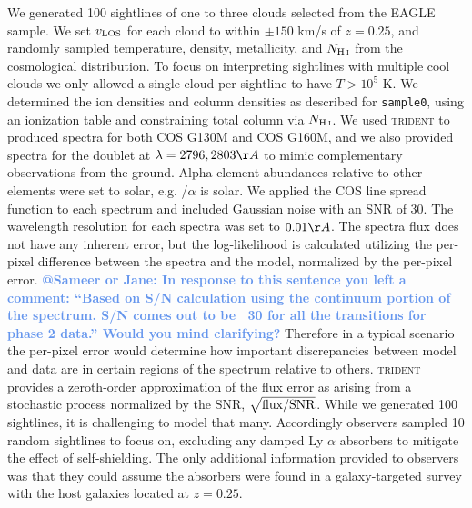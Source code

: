 \documentclass[fleqn,usenatbib]{mnras}
\makeatletter
\newcommand{\atsameer}[1]{\textcolor{CornflowerBlue}{\textbf{@Sameer or Jane: #1}}}
\newcommand{\atcameron}[1]{\textcolor{Thistle}{\textbf{@Cameron: #1}}}
\makeatother
\begin{document}

We generated 100 sightlines of one to three clouds selected from the EAGLE sample.
We set $v_{\rm LOS}$ for each cloud to within $\pm150$ km/s of $z=0.25$, and randomly sampled temperature, density, metallicity, and $N_{\ion{H}{I}}$ from the cosmological distribution.
To focus on interpreting sightlines with multiple cool clouds we only allowed a single cloud per sightline to have $T>10^5$ K.
We determined the ion densities and column densities as described for \texttt{sample0}, using an ionization table and constraining total column via $N_{\ion{H}{I}}$.
We used \textsc{trident} to produced spectra for both COS G130M and COS G160M, and we also provided spectra for the  doublet at $\lambda = 2796, 2803 \AA$ to mimic complementary observations from the ground.
Alpha element abundances relative to other elements were set to solar, e.g. /$\alpha$ is solar.
We applied the COS line spread function to each spectrum and included Gaussian noise with an SNR of 30.
The wavelength resolution for each spectra was set to $0.01 \AA$.
The spectra flux does not have any inherent error, but the log-likelihood is calculated utilizing the per-pixel difference between the spectra and the model, normalized by the per-pixel error.
\atsameer{In response to this sentence you left a comment: ``Based on S/N calculation using the continuum portion of the spectrum. S/N comes out to be ~30 for all the transitions for phase 2 data.'' Would you mind clarifying?}
Therefore in a typical scenario the per-pixel error would determine how important discrepancies between model and data are in certain regions of the spectrum relative to others.
\textsc{trident} provides a zeroth-order approximation of the flux error as arising from a stochastic process normalized by the SNR, $\sqrt{{\rm flux}/{\rm SNR}}$.
While we generated 100 sightlines, it is challenging to model that many.
Accordingly observers sampled 10 random sightlines to focus on, excluding any damped Ly $\alpha$ absorbers to mitigate the effect of self-shielding.
The only additional information provided to observers was that they could assume the absorbers were found in a galaxy-targeted survey with the host galaxies located at $z=0.25$.
\end{document}

